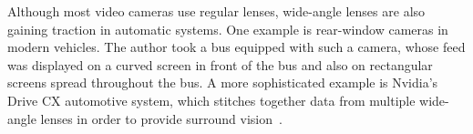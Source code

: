 \documentclass[english,12pt]{ifimaster}
\begin{document}

Although most video cameras use regular lenses, wide-angle lenses are
also gaining traction in automatic systems. One example is rear-window
cameras in modern vehicles. The author took a bus equipped with such a
camera, whose feed was displayed on a curved screen in front of the
bus and also on rectangular screens spread throughout the bus. A more
sophisticated example is Nvidia's Drive CX automotive system, which
stitches together data from multiple wide-angle lenses in order to
provide surround vision~\citep{nvidia15:-drivepx}.


\end{document}

